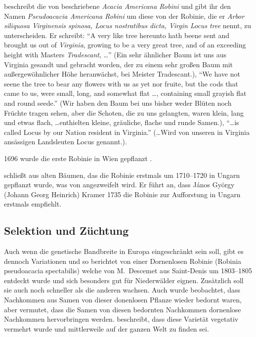 \documentclass[twocolumn]{scrartcl}
\begin{document}
\citet[S.~1550]{parkinson1640theatrumBotanicum} beschreibt die von
\cite{cornuti1635robinie} beschriebene \emph{Acacia Americana Robini}
und gibt ihr den Namen \emph{Pseudoacacia Americana Robini} um diese
von der Robinie, die er \emph{Arbor siliquosa Virginensis spinosa,
Locus nostratibus dicta, Virgin Locus tree} nennt, zu
unterscheiden. Er schreibt: \enquote{A very like tree hereunto hath beene sent and brought us out of \emph{Virginia}, growing to be a very great tree, and of an exceeding height with Masters \emph{Tradescant}, \dots}
(Ein sehr ähnlicher Baum ist uns aus Virginia gesandt und gebracht worden, der zu einem sehr großen Baum mit außergewöhnlicher Höhe heranwächst, bei Meister Tradescant.),
\enquote{We have not seene the tree to bear any flowers with us as yet nor fruite, but the cods that came to us, were small, long, and somewhat flat \dots, containing small grayish flat and round seede.}
(Wir haben den Baum bei uns bisher weder Blüten noch Früchte tragen sehen, aber die Schoten, die zu uns gelangten, waren klein, lang und etwas flach, \dots enthielten kleine, gräuliche, flache und runde Samen.),
\enquote{\dots is called Locus by our Nation resident in Virginia.}
(\dots Wird von unseren in Virginia ansässigen Landsleuten Locus genannt.).

1696 wurde die erste Robinie in Wien gepflanzt
\citep[S.~147]{loudon1838arboretum1}.

\citet[S.~3]{vadas1911robinie} schließt aus alten Bäumen, das
die Robinie erstmals um 1710--1720 in Ungarn gepflanzt wurde, was von
\citet[S.~179]{ernyey1926robinie} angezweifelt wird. Er führt an, dass
János György (Johann Georg Heinrich) Kramer 1735 die Robinie zur
Aufforstung in Ungarn erstmals empfiehlt.

\subsection{Selektion und Züchtung}

Auch wenn die genetische Bandbreite in Europa eingeschränkt sein soll, gibt es
dennoch Variationen und so berichtet \citet[S.~259--260]{Michaux1813arbres} von
einer Dornenlosen Robinie (Robinia pseudoacacia spectabilis) welche von
M.~Descemet aus Saint-Denis um 1803--1805 entdeckt wurde und sich besonders gut
für Niederwälder eignen. Zusätzlich soll sie auch noch schneller als die anderen
wachsen. Auch wurde beobachtet, dass Nachkommen aus Samen von dieser donenlosen
Pflanze wieder bedornt waren, aber \cite{Michaux1813arbres} vermutet, dass die
Samen von diesen bedornten Nachkommen dornenlose Nachkommen hervorbringen
werden. \citet[S.~173]{quatrefages1861robinie} beschreibt, dass diese Varietät
vegetativ vermehrt wurde und mittlerweile auf der ganzen Welt zu finden sei.
\end{document}
